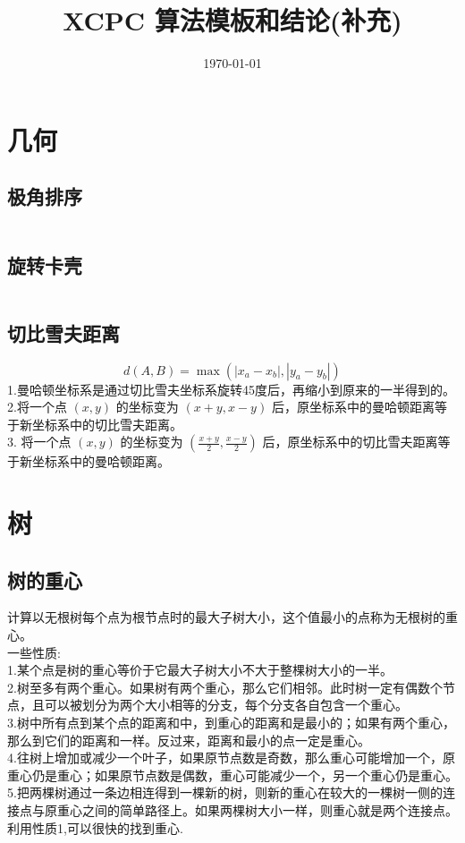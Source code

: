 \documentclass[a4paper]{report}
\title{XCPC 算法模板和结论(补充)}
\date{\today}
\newcommand{\cppcode}[1]{  
    \inputminted[mathescape]{cpp}{source/#1}  
}
\begin{document}
\maketitle
\tableofcontents
\clearpage

\chapter{几何}
\section{极角排序}
\cppcode{psort.cpp}

\section{旋转卡壳}
\cppcode{旋转卡壳.cpp}

\section{切比雪夫距离}
$$
  d(A,B)=\max(|x_a-x_b|,|y_a-y_b|)
$$
1.曼哈顿坐标系是通过切比雪夫坐标系旋转45度后，再缩小到原来的一半得到的。\\
2.将一个点 $(x ,y)$ 的坐标变为 $(x + y, x -y)$ 后，原坐标系中的曼哈顿距离等于新坐标系中的切比雪夫距离。\\
3. 将一个点 $(x, y)$ 的坐标变为 $(\frac{x+y}{2},\frac{x-y}{2})$ 后，原坐标系中的切比雪夫距离等于新坐标系中的曼哈顿距离。\\




\chapter{树}
\section{树的重心}
计算以无根树每个点为根节点时的最大子树大小，这个值最小的点称为无根树的重心。\\
一些性质:\\
1.某个点是树的重心等价于它最大子树大小不大于整棵树大小的一半。\\
2.树至多有两个重心。如果树有两个重心，那么它们相邻。此时树一定有偶数个节点，且可以被划分为两个大小相等的分支，每个分支各自包含一个重心。\\
3.树中所有点到某个点的距离和中，到重心的距离和是最小的；如果有两个重心，那么到它们的距离和一样。反过来，距离和最小的点一定是重心。\\
4.往树上增加或减少一个叶子，如果原节点数是奇数，那么重心可能增加一个，原重心仍是重心；如果原节点数是偶数，重心可能减少一个，另一个重心仍是重心。\\
5.把两棵树通过一条边相连得到一棵新的树，则新的重心在较大的一棵树一侧的连接点与原重心之间的简单路径上。如果两棵树大小一样，则重心就是两个连接点。\\
利用性质1,可以很快的找到重心.
\end{document}
